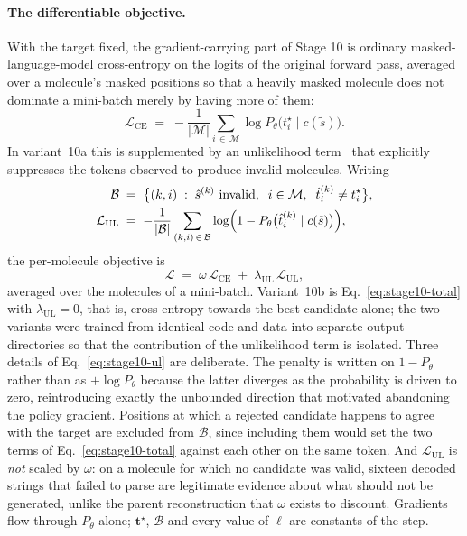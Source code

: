 \paragraph{The differentiable objective.}
With the target fixed, the gradient-carrying part of Stage 10 is ordinary
masked-language-model cross-entropy on the logits of the original forward pass,
averaged over a molecule's masked positions so that a heavily masked molecule
does not dominate a mini-batch merely by having more of them:
\begin{equation}
\mathcal{L}_{\mathrm{CE}} \;=\; -\frac{1}{|\mathcal{M}|}
\sum_{i \,\in\, \mathcal{M}} \log P_{\theta}\bigl(t^{\star}_i \mid c(\tilde{s})\bigr).
\label{eq:stage10-ce}
\end{equation}
In variant~10a this is supplemented by an unlikelihood
term~\cite{welleck2020unlikelihood} that explicitly suppresses the tokens
observed to produce invalid molecules. Writing
\begin{align}
\mathcal{B} \;&=\; \bigl\{ (k,i) \;:\; \hat{s}^{(k)}\ \text{invalid},\;\;
i \in \mathcal{M},\;\; \hat{t}^{(k)}_i \neq t^{\star}_i \bigr\}, \notag \\
\mathcal{L}_{\mathrm{UL}} \;&=\; -\frac{1}{|\mathcal{B}|}
\sum_{(k,i) \,\in\, \mathcal{B}}
\log\Bigl(1 - P_{\theta}\bigl(\hat{t}^{(k)}_i \mid c(\tilde{s})\bigr)\Bigr),
\label{eq:stage10-ul}
\end{align}
the per-molecule objective is
\begin{equation}
\mathcal{L} \;=\; \omega\,\mathcal{L}_{\mathrm{CE}}
\;+\; \lambda_{\mathrm{UL}}\,\mathcal{L}_{\mathrm{UL}},
\label{eq:stage10-total}
\end{equation}
averaged over the molecules of a mini-batch. Variant~10b is
Eq.~\eqref{eq:stage10-total} with $\lambda_{\mathrm{UL}}=0$, that is,
cross-entropy towards the best candidate alone; the two variants were trained
from identical code and data into separate output directories so that the
contribution of the unlikelihood term is isolated. Three details of
Eq.~\eqref{eq:stage10-ul} are deliberate. The penalty is written on
$1-P_{\theta}$ rather than as $+\log P_{\theta}$ because the latter diverges as
the probability is driven to zero, reintroducing exactly the unbounded
direction that motivated abandoning the policy gradient. Positions at which a
rejected candidate happens to agree with the target are excluded from
$\mathcal{B}$, since including them would set the two terms of
Eq.~\eqref{eq:stage10-total} against each other on the same token. And
$\mathcal{L}_{\mathrm{UL}}$ is \emph{not} scaled by $\omega$: on a molecule for
which no candidate was valid, sixteen decoded strings that failed to parse are
legitimate evidence about what should not be generated, unlike the parent
reconstruction that $\omega$ exists to discount. Gradients flow through
$P_{\theta}$ alone; $\mathbf{t}^{\star}$, $\mathcal{B}$ and every value of
$\ell$ are constants of the step.


